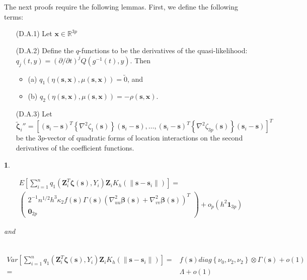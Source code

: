 \documentclass[12pt,english,authoryear, review]{article}\usepackage[]{graphicx}\usepackage[]{color}
\theoremstyle{plain}
\theoremstyle{plain}
\newtheorem{lem}{\protect\lemmaname}
\providecommand{\lemmaname}{Lemma}
\begin{document}
The next proofs require the following lemmas. First, we define the
following terms:
\begin{itemize}
\item[(D.A.1)] Let $\bm{x}\in\mathbb{R}^{3p}$
\item[(D.A.2)] Define the $q$-functions to be the derivatives of the quasi-likelihood:
$q_{j}(t,y)=\left(\partial/\partial t\right)^{j}Q\left(g^{-1}\left(t\right),y\right)$.
Then

\begin{itemize}
\item (a) $q_{1}\left(\eta\left(\bm{s},\bm{x}\right),\mu\left(\bm{s},\bm{x}\right)\right)=\utilde{0}$,
and 
\item (b) $q_{2}\left(\eta\left(\bm{s},\bm{x}\right),\mu\left(\bm{s},\bm{x}\right)\right)=-\rho\left(\bm{s},\bm{x}\right)$.
\end{itemize}
\item[(D.A.3)] Let $\tilde{\bm{\zeta}}_{i}''=\left[\left(\bm{s}_{i}-\bm{s}\right)^{T}\left\{ \nabla^{2}\zeta_{1}\left(\bm{s}\right)\right\} \left(\bm{s}_{i}-\bm{s}\right),\dots,\left(\bm{s}_{i}-\bm{s}\right)^{T}\left\{ \nabla^{2}\zeta_{3p}\left(\bm{s}\right)\right\} \left(\bm{s}_{i}-\bm{s}\right)\right]^{T}$
be the $3p$-vector of quadratic forms of location interactions on
the second derivatives of the coefficient functions.\end{itemize}
\begin{lem}
\label{lemma:omega}

\begin{multline*}
E\left[\sum_{i=1}^{n}q_{1}\left(\bm{Z}_{i}^{T}\bm{\zeta}\left(\bm{s}\right),Y_{i}\right)\bm{Z}_{i}K_{h}\left(\|\bm{s}-\bm{s}_{i}\|\right)\right]=\\
\left(\begin{array}{c}
2^{-1}n^{1/2}h^{3}\kappa_{2}f\left(\bm{s}\right)\Gamma\left(\bm{s}\right)\left(\nabla_{uu}^{2}\bm{\beta}\left(\bm{s}\right)+\nabla_{vv}^{2}\bm{\beta}\left(\bm{s}\right)\right)^{T}\\
\bm{0}_{2p}
\end{array}\right)+o_{p}\left(h^{2}\bm{1}_{3p}\right)
\end{multline*}


and 

\begin{align*}
\end{align*}


\begin{align*}
Var\left[\sum_{i=1}^{n}q_{1}\left(\bm{Z}_{i}^{T}\bm{\zeta}\left(\bm{s}\right),Y_{i}\right)\bm{Z}_{i}K_{h}\left(\|\bm{s}-\bm{s}_{i}\|\right)\right]= & f\left(\bm{s}\right)diag\left\{ \nu_{0},\nu_{2},\nu_{2}\right\} \otimes\Gamma\left(\bm{s}\right)+o\left(1\right)\\
= & \Lambda+o\left(1\right)
\end{align*}

\end{lem}
\end{document}
